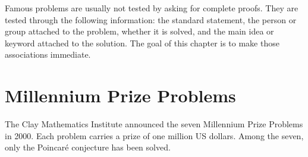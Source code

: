     Famous problems are usually not tested by asking for complete proofs. They
    are tested through the following information: the standard statement, the
    person or group attached to the problem, whether it is solved, and the main
    idea or keyword attached to the solution. The goal of this chapter is to
    make those associations immediate.

    \section*{Millennium Prize Problems}

    The Clay Mathematics Institute announced the seven Millennium Prize Problems
    in 2000. Each problem carries a prize of one million US dollars. Among the
    seven, only the Poincaré conjecture has been solved.

    \vspace{1em}

